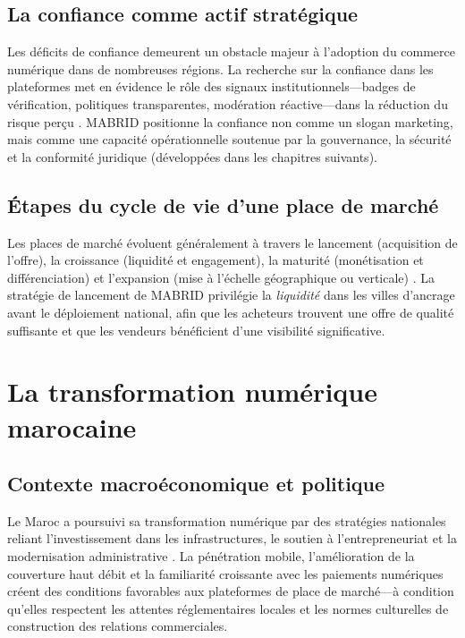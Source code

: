 
\subsection{La confiance comme actif stratégique}

Les déficits de confiance demeurent un obstacle majeur à l'adoption du commerce numérique dans de nombreuses régions. La recherche sur la confiance dans les plateformes met en évidence le rôle des signaux institutionnels---badges de vérification, politiques transparentes, modération réactive---dans la réduction du risque perçu \parencite{mcknight2002trust,eisenmann2006strategies}. MABRID positionne la confiance non comme un slogan marketing, mais comme une capacité opérationnelle soutenue par la gouvernance, la sécurité et la conformité juridique (développées dans les chapitres suivants).

\subsection{Étapes du cycle de vie d'une place de marché}

Les places de marché évoluent généralement à travers le lancement (acquisition de l'offre), la croissance (liquidité et engagement), la maturité (monétisation et différenciation) et l'expansion (mise à l'échelle géographique ou verticale) \parencite{chen2018liquidity}. La stratégie de lancement de MABRID privilégie la \emph{liquidité} dans les villes d'ancrage avant le déploiement national, afin que les acheteurs trouvent une offre de qualité suffisante et que les vendeurs bénéficient d'une visibilité significative.

\section{La transformation numérique marocaine}

\subsection{Contexte macroéconomique et politique}

Le Maroc a poursuivi sa transformation numérique par des stratégies nationales reliant l'investissement dans les infrastructures, le soutien à l'entrepreneuriat et la modernisation administrative \parencite{mcit2020digital,morocco2025digital}. La pénétration mobile, l'amélioration de la couverture haut débit et la familiarité croissante avec les paiements numériques créent des conditions favorables aux plateformes de place de marché---à condition qu'elles respectent les attentes réglementaires locales et les normes culturelles de construction des relations commerciales.

